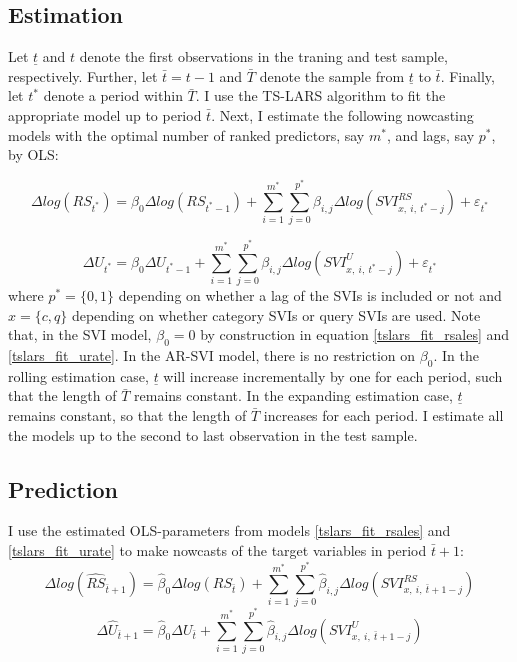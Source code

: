 \subsection{Estimation}\label{estimation}

Let $\underline{t}$ and $t$ denote the first observations in the traning and test sample, respectively. Further, let $\bar{t} = t - 1$  and $\bar{T}$ denote the sample from $\underline{t}$ to $\bar{t}$. Finally, let $t^{*}$ denote a period within $\bar{T}$. I use the TS-LARS algorithm to fit the appropriate model up to period $\bar{t}$. Next, I estimate the following nowcasting models with the optimal number of ranked predictors, say $m^{*}$, and lags, say $p^{*}$, by OLS:

\begin{equation}\label{tslars_fit_rsales}
\Delta log(RS_{t^{*}}) = \beta_0 \Delta log(RS_{t^{*} - 1}) + \sum_{i = 1}^{m^{*}}\sum_{j = 0}^{p^{*}} \beta_{i, j} \Delta log(SVI_{x,\ i,\ t^{*} - j}^{RS}) + \varepsilon_{t^{*}}
\end{equation}

\begin{equation}\label{tslars_fit_urate}
\Delta U_{t^{*}} = \beta_0 \Delta U_{t^{*} - 1} + \sum_{i = 1}^{m^{*}}\sum_{j = 0}^{p^{*}} \beta_{i, j} \Delta log(SVI_{x,\ i,\ t^{*} - j}^U) + \varepsilon_{t^{*}}
\end{equation}
\noindent where $p^{*} = \{0, 1\}$ depending on whether a lag of the SVIs is included or not and $x = \{c, q\}$ depending on whether category SVIs or query SVIs are used. Note that, in the SVI model, $\beta_0 = 0$ by construction in equation \eqref{tslars_fit_rsales} and \eqref{tslars_fit_urate}. In the AR-SVI model, there is no restriction on $\beta_0$. In the rolling estimation case, $\underline{t}$ will increase incrementally by one for each period, such that the length of $\bar{T}$ remains constant. In the expanding estimation case, $\underline{t}$ remains constant, so that the length of $\bar{T}$ increases for each period. I estimate all the models up to the second to last observation in the test sample.



\subsection{Prediction}\label{prediction}

I use the estimated OLS-parameters from models \eqref{tslars_fit_rsales} and \eqref{tslars_fit_urate} to make nowcasts of the target variables in period $\bar{t} + 1$:
\begin{equation}\label{nowcast_rsales}
\Delta log(\hat{RS}_{\bar{t} + 1}) = \hat{\beta}_0 \Delta log(RS_{\bar{t}}) + \sum_{i = 1}^{m^{*}}\sum_{j = 0}^{p^{*}} \hat{\beta}_{i, j} \Delta log(SVI_{x,\ i,\ \bar{t} + 1 - j}^{RS})
\end{equation}
\begin{equation}\label{nowcast_urate}
\Delta \hat{U}_{\bar{t} + 1} = \hat{\beta}_0 \Delta U_{\bar{t}} + \sum_{i = 1}^{m^{*}}\sum_{j = 0}^{p^{*}} \hat{\beta}_{i, j} \Delta log(SVI_{x,\ i,\ \bar{t} + 1 - j}^{U})
\end{equation}

